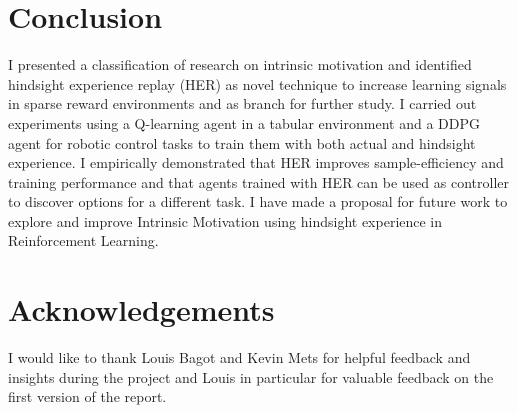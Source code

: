 \documentclass[conference]{IEEEtran}
\begin{document}
\section{Conclusion} \label{sec:conclusion}
I presented a classification of research on intrinsic motivation and identified hindsight experience replay (HER) as novel technique to increase learning signals in sparse reward environments and as branch for further study. I carried out experiments using a Q-learning agent in a tabular environment and a DDPG agent for robotic control tasks to train them with both actual and hindsight experience. I empirically demonstrated that HER improves sample-efficiency and training performance and that agents trained with HER can be used as controller to discover options for a different task. I have made a proposal for future work to explore and improve Intrinsic Motivation using hindsight experience in Reinforcement Learning.

\section*{Acknowledgements}
I would like to thank Louis Bagot and Kevin Mets for helpful feedback and insights during the project and Louis in particular for valuable feedback on the first version of the report.

\printbibliography
\end{document}
